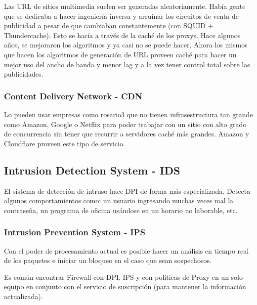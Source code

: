 \documentclass{book}
\begin{document}
	\vspace{3mm}
	Las URL de sitios multimedia suelen ser generadas aleatoriamente. Había gente que se dedicaba a hacer ingeniería inversa y arruinar los circuitos de venta de publicidad a pesar de que cambiaban constantemente (con SQUID + Thundercache). Esto se hacía a través de la caché de los proxys. Hace algunos años, se mejoraron los algoritmos y ya casi no se puede hacer. Ahora los mismos que hacen los algoritmos de generación de URL proveen caché para hacer un mejor uso del ancho de banda y menor lag y a la vez tener control total sobre las publicidades.
	
	\subsubsection{Content Delivery Network - CDN}
	Lo pueden usar empresas como rosario3 que no tienen infrasestructura tan grande como Amazon, Google o Netflix para poder trabajar con un sitio con alto grado de concurrencia sin tener que recurrir a servidores caché más grandes. Amazon y Cloudflare proveen este tipo de servicio.
	
	\subsection{Intrusion Detection System - IDS}
	El sistema de detección de intruso hace DPI de forma más especializada. Detecta algunos comportamientos como: un usuario ingresando muchas veces mal la contraseña, un programa de oficina usándose en un horario no laborable, etc.
	
	\subsubsection{Intrusion Prevention System - IPS}
	Con el poder de procesamiento actual es posible hacer un análisis en tiempo real de los paquetes e iniciar un bloqueo en el caso que sean sospechosos.
	
	\vspace{3mm}
	Es común encontrar Firewall con DPI, IPS y con políticas de Proxy en un solo equipo en conjunto con el servicio de suscripción (para mantener la información actualizada).
	
\end{document}
